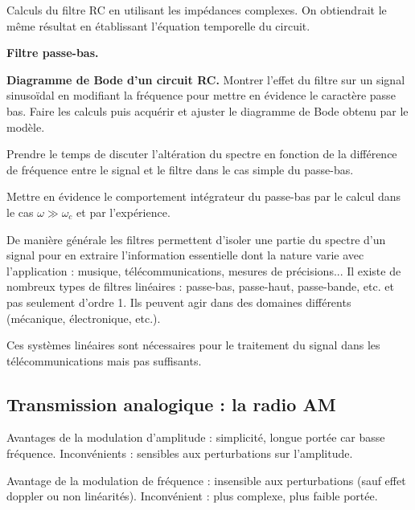 Calculs du filtre RC en utilisant les impédances complexes.
On obtiendrait le même résultat en établissant l'équation temporelle du circuit.

\begin{slide}
\textbf{Filtre passe-bas.}
\end{slide}

\begin{experience}
\textbf{Diagramme de Bode d'un circuit RC.}
Montrer l'effet du filtre sur un signal sinusoïdal en modifiant la fréquence pour mettre en évidence le caractère passe bas.
Faire les calculs puis acquérir et ajuster le diagramme de Bode obtenu par le modèle.
\end{experience}

\begin{remarque}
Prendre le temps de discuter l'altération du spectre en fonction de la différence de fréquence entre le signal et le filtre dans le cas simple du passe-bas.
\end{remarque}

Mettre en évidence le comportement intégrateur du passe-bas par le calcul dans le cas $\omega\gg\omega_c$ et par l'expérience.

De manière générale les filtres permettent d'isoler une partie du spectre d'un signal pour en extraire l'information essentielle dont la nature varie avec l'application : musique, télécommunications, mesures de précisions...
Il existe de nombreux types de filtres linéaires : passe-bas, passe-haut, passe-bande, etc. et pas seulement d'ordre 1.
Ils peuvent agir dans des domaines différents (mécanique, électronique, etc.).

\begin{transition}
Ces systèmes linéaires sont nécessaires pour le traitement du signal dans les télécommunications mais pas suffisants.
\end{transition}

\subsection{Transmission analogique : la radio AM}

\begin{remarque}
Avantages de la modulation d'amplitude : simplicité, longue portée car basse fréquence.
Inconvénients : sensibles aux perturbations sur l'amplitude.

\noindent
Avantage de la modulation de fréquence : insensible aux perturbations (sauf effet doppler ou non linéarités).
Inconvénient : plus complexe, plus faible portée.
\end{remarque}

